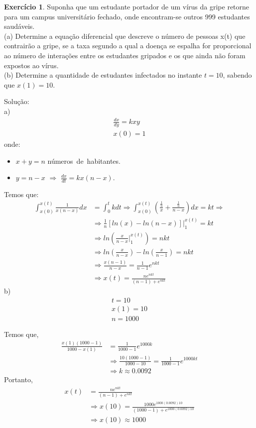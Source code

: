 \documentclass[a4paper,12pt,reqno,natbib]{amsart}
\theoremstyle{definition}
\newtheorem{exercise}{Exerc\'icio}
\newcommand{\mathbox}[1]{\hspace{2pt}\mbox{#1}}
\begin{document}
\begin{exercise}
Suponha que um estudante portador de um vírus da gripe retorne para um campus universitário fechado, onde encontram-se outros 999 estudantes saudáveis. \\
(a) Determine a equação diferencial que descreve o número de pessoas x(t) que contrairão a gripe, se a taxa segundo a qual a doença se espalha for proporcional ao número de interações entre os estudantes gripados e os que ainda não foram expostos ao vírus. \\
(b) Determine a quantidade de estudantes infectados no instante $t = 10$, sabendo que $x(1) = 10$.
\end{exercise}
Solu\c c\~ao:\\
a)
\begin{align*}
	\frac{dx}{dy} = kxy\\
	x(0) = 1
\end{align*}
onde:
\begin{itemize}
	\item $x + y = n$ \mathbox{n\'umeros de habitantes}.
	\item $y = n -x$ $\Rightarrow$ $\frac{dx}{dt} = kx(n - x)$.
\end{itemize}
Temos que:
\begin{align*}
	\int_{x(0)}^{x(t)} \frac{1}{x(n-x)}dx &= \int_{0}^{t} kdt \Rightarrow \int_{x(0)}^{x(t)}
	(\frac{\frac{1}{n}}{x} + \frac{\frac{1}{n}}{n-x}) dx = kt \Rightarrow \\
	&\Rightarrow \frac{1}{n}\left [ ln(x) - ln (n -x)\right ] \bigg \vert_{1}^{x(t)} = kt \\
	&\Rightarrow  ln\left (\frac{x}{n-x} \bigg \vert_{1}^{x(t)} \right ) = nkt\\
	&\Rightarrow  ln\left (\frac{x}{n-x} \right ) - ln\left (\frac{x}{n-1} \right ) = nkt  \\ 
	&\Rightarrow  \frac{x(n-1)}{n-x} =\frac{1}{n-1} e^{nkt}  \\ 
	&\Rightarrow \boxed{x(t) = \frac{ne^{nkt}}{(n-1) + e^{nkt}}} 
\end{align*}
b)
\begin{align*}
	t = 10 \\
	x(1) = 10\\
	n = 1000
\end{align*}

Temos que,
\begin{align*}
   \frac{x(1)(1000-1)}{1000-x(1)} &=\frac{1}{1000-1} e^{1000k}\\
	&\Rightarrow   \frac{10(1000-1)}{1000-10} =\frac{1}{1000-1} e^{1000kt}  \\
	&\Rightarrow \boxed{k \approx 0.0092} 
\end{align*}
Portanto,
	\begin{align*}
		x(t) &= \frac{ne^{nkt}}{(n-1) + e^{nkt}}\\
		&\Rightarrow x(10) = \frac{1000e^{1000(0.0092)10}}{(1000-1) + e^{1000(0.0092)10}} \\
		&\Rightarrow \boxed{x(10) \approx 1000}
	\end{align*}
\newpage
\end{document}
